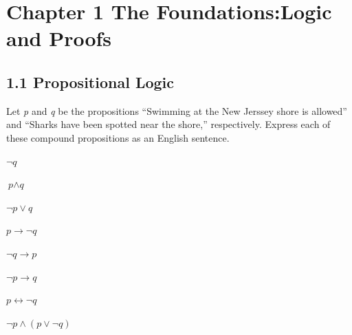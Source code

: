 \documentclass[a4paper,12pt,oneside,article]{memoir}
\begin{document}
\chapter*{Chapter 1 The Foundations:Logic and Proofs}
\section{1.1 Propositional Logic}

	\begin{tcolorbox}
		[colback=Emerald!10,colframe=cyan!40!black,title=\textbf{Question 11}]
		Let \textit{p} and \textit{q} be the propositions ``Swimming at the New Jerssey shore is allowed'' and ``Sharks have been spotted near the shore,'' respectively. Express each of these compound propositions as an English sentence.\\

		\begin{shortenumerate}[a]
			\item $\lnot \textit{q} $
			\item $\textit{p}\land \textit{q} $
			\item $\lnot \textit{p}\lor \textit{q} $
			\item $\textit{p}\rightarrow \lnot \textit{q} $
			\item $\lnot \textit{q} \rightarrow \textit{p}$
			\item $\lnot \textit{p}\rightarrow \textit{q} $
			\item $\textit{p}\leftrightarrow \lnot \textit{q} $
			\item $\lnot \textit{p}\land (\textit{p}\lor \lnot \textit{q} )$
		\end{shortenumerate}
	\end{tcolorbox}
\end{document}
